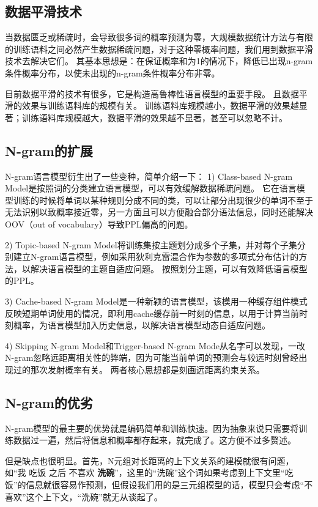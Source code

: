 \subsection{数据平滑技术}
当数据匮乏或稀疏时，会导致很多词的概率预测为零，大规模数据统计方法与有限的训练语料之间必然产生数据稀疏问题，对于这种零概率问题，我们用到数据平滑技术去解决它们。
其基本思想是：在保证概率和为1的情况下，降低已出现n-gram条件概率分布，以使未出现的n-gram条件概率分布非零。

目前数据平滑的技术有很多，它是构造高鲁棒性语言模型的重要手段。
且数据平滑的效果与训练语料库的规模有关。
训练语料库规模越小，数据平滑的效果越显著；训练语料库规模越大，数据平滑的效果越不显著，甚至可以忽略不计。


\subsection{N-gram的扩展}
N-gram语言模型衍生出了一些变种，简单介绍一下：
1)	Class-based N-gram Model\cite{brown1992class}是按照词的分类建立语言模型，可以有效缓解数据稀疏问题。
它在语言模型训练的时候将单词以某种规则分成不同的类，可以让部分出现很少的单词不至于无法识别以致概率接近零，另一方面且可以方便融合部分语法信息，同时还能解决OOV（out of vocabulary）导致PPL偏高的问题。

2)	Topic-based N-gram Model将训练集按主题划分成多个子集，并对每个子集分别建立N-gram语言模型，例如采用狄利克雷混合作为参数的多项式分布估计的方法\cite{gildea1999topic}，以解决语言模型的主题自适应问题。
按照划分主题，可以有效降低语言模型的PPL。

3)	Cache-based N-gram Model是一种新颖的语言模型，该模用一种缓存组件模式反映短期单词使用的情况\cite{kuhn1990cache}，即利用cache缓存前一时刻的信息，以用于计算当前时刻概率，为语言模型加入历史信息，以解决语言模型动态自适应问题。

4)	Skipping N-gram Model和Trigger-based N-gram Mode从名字可以发现，一改N-gram忽略远距离相关性的弊端，因为可能当前单词的预测会与较远时刻曾经出现过的那次发射概率有关。
两者核心思想都是刻画远距离约束关系。


\subsection{N-gram的优劣}
N-gram模型的最主要的优势就是编码简单和训练快速。因为抽象来说只需要将训练数据过一遍，然后将信息和概率都存起来，就完成了。这方便不过多赘述。

但是缺点也很明显。首先，N元组对长距离的上下文关系的建模就很有问题，如“我 吃饭 之后 不喜欢 \textbf{洗碗}”，这里的“洗碗”这个词如果考虑到上下文里“吃饭”的信息就很容易作预测，但假设我们用的是三元组模型的话，模型只会考虑“不 喜欢”这个上下文，“洗碗”就无从谈起了。

